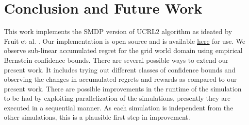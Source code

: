 
\chapter{Conclusion and Future Work}

This work implements the SMDP version of UCRL2 algorithm as ideated by Fruit et al. \cite{fruit_regret_2017}.
Our implementation is open source and is available \href{https://github.com/say4n/options}{here} for use.
We observe sub-linear accumulated regret for the grid world domain using empirical Bernstein confidence bounds.
There are several possible ways to extend our present work.
It includes trying out different classes of confidence bounds and observing the changes in accumulated regrets and rewards as compared to our present work.
There are possible improvements in the runtime of the simulation to be had by exploiting parallelization of the simulations, presently they are executed in a sequential manner.
As each simulation is independent from the other simulations, this is a plausible first step in improvement.

\newpage
